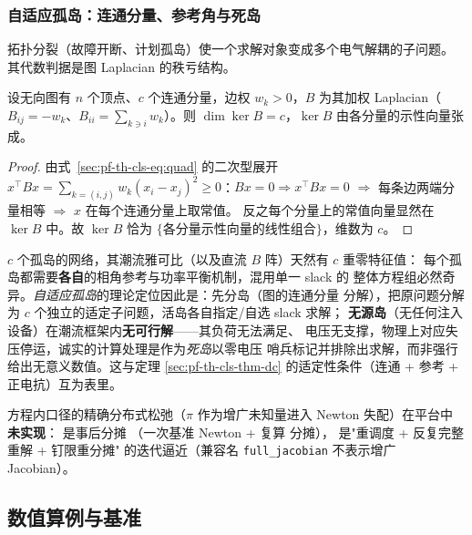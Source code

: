 \subsubsection{自适应孤岛：连通分量、参考角与死岛}

拓扑分裂（故障开断、计划孤岛）使一个求解对象变成多个电气解耦的子问题。
其代数判据是图 Laplacian 的秩亏结构。

\begin{lemma}[Laplacian 零空间的维数 = 连通分量数]\label{sec:pf-th-cls-lem-lap}
设无向图有 $n$ 个顶点、$c$ 个连通分量，边权 $w_k>0$，$B$ 为其加权
Laplacian（$B_{ij}=-w_k$、$B_{ii}=\sum_{k\ni i}w_k$）。则
$\dim\ker B=c$，$\ker B$ 由各分量的示性向量张成。
\end{lemma}

\begin{proof}
由式~\eqref{sec:pf-th-cls-eq:quad} 的二次型展开
$x^{\top}Bx=\sum_{k=(i,j)}w_k(x_i-x_j)^2\ge0$：$Bx=0\Rightarrow x^{\top}Bx=0$
$\Rightarrow$ 每条边两端分量相等 $\Rightarrow$ $x$ 在每个连通分量上取常值。
反之每个分量上的常值向量显然在 $\ker B$ 中。故 $\ker B$ 恰为
$\{\text{各分量示性向量的线性组合}\}$，维数为 $c$。
\end{proof}

\begin{remark}\label{sec:pf-th-cls-rem-island}
$c$ 个孤岛的网络，其潮流雅可比（以及直流 $B$ 阵）天然有 $c$ 重零特征值：
每个孤岛都需要\textbf{各自}的相角参考与功率平衡机制，混用单一 slack 的
整体方程组必然奇异。\emph{自适应孤岛}的理论定位因此是：先分岛（图的连通分量
分解），把原问题分解为 $c$ 个独立的适定子问题，活岛各自指定/自选 slack 求解；
\textbf{无源岛}（无任何注入设备）在潮流框架内\textbf{无可行解}——其负荷无法满足、
电压无支撑，物理上对应失压停运，诚实的计算处理是作为\emph{死岛}以零电压
哨兵标记并排除出求解，而非强行给出无意义数值。这与定理
\ref{sec:pf-th-cls-thm-dc} 的适定性条件（连通 + 参考 + 正电抗）互为表里。
\end{remark}

\begin{gapnote}
方程内口径的精确分布式松弛（$\pi$ 作为增广未知量进入 Newton 失配）在平台中
\textbf{未实现}： 是事后分摊
（一次基准 Newton +  复算
分摊）， 是"重调度 + 反复完整重解 + 钉限重分摊"
的迭代逼近（兼容名 \texttt{full\_jacobian} 不表示增广 Jacobian）。
\end{gapnote}

\subsection{数值算例与基准}\label{sec:pf-th-cls-numexp}

